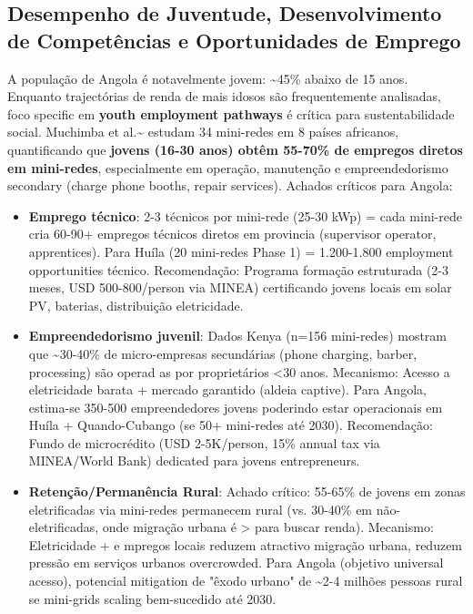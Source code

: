 \documentclass[12pt, a4paper]{article}
\begin{document}
\subsection{Desempenho de Juventude, Desenvolvimento de Competências e Oportunidades de Emprego}

A população de Angola é notavelmente jovem: \textasciitilde{}45\% abaixo de 15 anos. Enquanto trajectórias de renda de mais idosos são frequentemente analisadas, foco specific em 
\textbf{youth employment pathways} é crítica para sustentabilidade social. Muchimba et al.\textasciitilde{}\citep{Muchimba2025} estudam 34 mini-redes em 8 países africanos, quantificando que 
\textbf{jovens (16-30 anos) obtêm 55-70\% de empregos diretos em mini-redes}, especialmente em operação, manutenção e empreendedorismo secondary (charge phone booths, repair services). Achados críticos para Angola:

\begin{itemize}
\item \textbf{Emprego técnico}: 2-3 técnicos por mini-rede (25-30 kWp) = cada mini-rede cria 60-90+ empregos técnicos diretos em provincia (supervisor operator, apprentices). Para Huíla (20 mini-redes Phase 1) = 1.200-1.800 employment opportunities técnico. Recomendação: Programa formação estruturada (2-3 meses, USD 500-800/person via MINEA) certificando jovens locais em solar PV, baterias, distribuição eletricidade.

\item \textbf{Empreendedorismo juvenil}:  Dados Kenya (n=156 mini-redes) mostram que \textasciitilde{}30-40\% de micro-empresas secundárias (phone charging, barber, processing) são operad as por proprietários <30 anos. Mecanismo: Acesso a eletricidade barata + mercado garantido (aldeia captive). Para Angola, estima-se 350-500 empreendedores jovens poderindo estar operacionais em Huíla + Quando-Cubango (se 50+ mini-redes até 2030). Recomendação: Fundo de microcrédito (USD 2-5K/person, 15\% annual tax via MINEA/World Bank) dedicated para jovens entrepreneurs.

\item \textbf{Retenção/Permanência Rural}: Achado crítico: 55-65\% de jovens em zonas eletrificadas via mini-redes permanecem rural (vs. 30-40\% em não-eletrificadas, onde migração urbana é > para buscar renda). Mecanismo: Eletricidade + e mpregos locais reduzem atractivo migração urbana, reduzem pressão em serviços urbanos overcrowded. Para Angola (objetivo universal acesso), potencial mitigation de "êxodo urbano" de \textasciitilde{}2-4 milhões pessoas rural se mini-grids scaling bem-sucedido até 2030.
\end{itemize}
\end{document}
